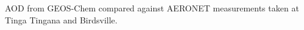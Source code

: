 \label{fig:AODComparison}
  
AOD from GEOS-Chem compared against AERONET measurements taken at Tinga Tingana and Birdsville.